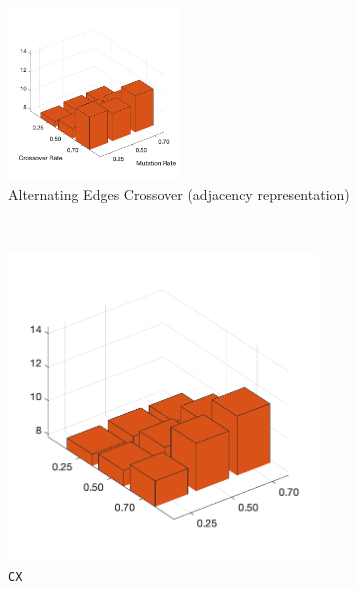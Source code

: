 \begin{figure}[H]
	\centering
%
	\begin{subfigure}[b]{0.7\textwidth}
		\centering
		\includegraphics[width=0.5\textwidth]{crossover/min/cross_alt_edges_2.png}
		\caption{Alternating Edges Crossover (adjacency representation)}
		\label{fig:z}
    	\end{subfigure}\\
%
	\begin{subfigure}[b]{0.25\textwidth}
		\centering
		\includegraphics[width=0.9\textwidth]{crossover/min/cross_cycle_2.png}
		\caption{\texttt{CX}}
		\label{fig:x}
    	\end{subfigure}
%
	\begin{subfigure}[b]{0.25\textwidth}
		\centering

\end{subfigure}
\end{figure}
